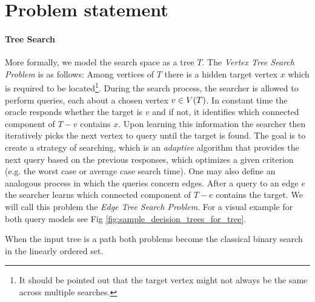 \section{Problem statement}
\paragraph{Tree Search}
More formally, we model the search space as a tree $T$. The \textit{Vertex Tree Search Problem} is as follows: Among vertices of $T$ there is a hidden target vertex $x$ which is required to be located\footnote{It should be pointed out that the target vertex might not always be the same across multiple searches.}. During the search process, the searcher is allowed to perform queries, each about a chosen vertex $v\in V\mathopen{}\left( T \right)$. In constant time the oracle responds whether the target is $v$ and if not, it identifies which connected component of $T-v$ contains $x$. Upon learning this information the searcher then iteratively picks the next vertex to query until the target is found. The goal is to create a strategy of searching, which is an \textit{adaptive} algorithm that provides the next query based on the previous responses, which optimizes a given criterion (e.g. the worst case or average case search time).
One may also define an analogous process in which the queries concern edges. After a query to an edge $e$ the searcher learns which connected component of $T-e$ contains the target. We will call this problem the \textit{Edge Tree Search Problem}. For a visual example for both query models see Fig \ref{fig:sample_decision_trees_for_tree}.  


When the input tree is a path both problems become the classical binary search in the linearly ordered set.



